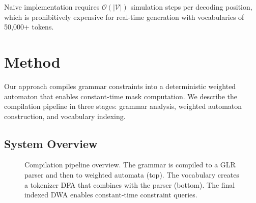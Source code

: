 \documentclass[11pt,a4paper]{article}
\newcommand{\bigO}{\mathcal{O}}
\newcommand{\vocab}{\mathcal{V}}
\theoremstyle{plain}
\theoremstyle{definition}
\theoremstyle{remark}
\begin{document}
Naive implementation requires $\bigO(|\vocab|)$ simulation steps per decoding position, which is prohibitively expensive for real-time generation with vocabularies of 50,000+ tokens.

\section{Method}
\label{sec:method}

Our approach compiles grammar constraints into a deterministic weighted automaton that enables constant-time mask computation. We describe the compilation pipeline in three stages: grammar analysis, weighted automaton construction, and vocabulary indexing.

\subsection{System Overview}

\begin{figure}[t]
\centering
{}
\caption{Compilation pipeline overview. The grammar is compiled to a GLR parser and then to weighted automata (top). The vocabulary creates a tokenizer DFA that combines with the parser (bottom). The final indexed DWA enables constant-time constraint queries.}
\label{fig:pipeline}
\end{figure}
\end{document}
